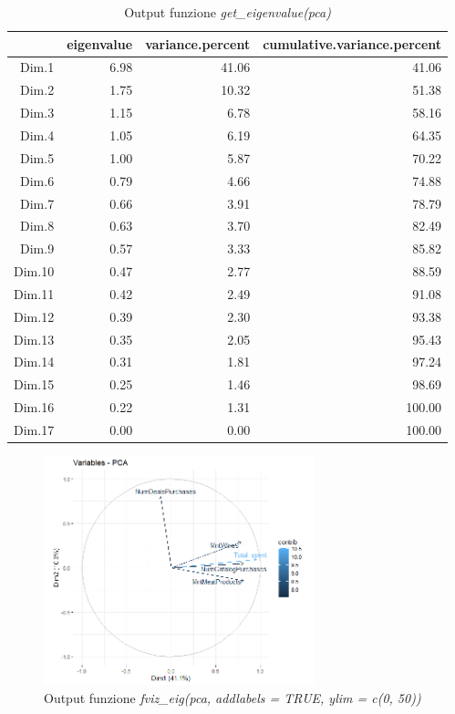 \documentclass[letterpaper,11pt]{article}
\begin{document}
\begin{table}[h!t]
\centering
\begin{tabular}{rrrr}
  \hline
 & eigenvalue & variance.percent & cumulative.variance.percent \\ 
  \hline
Dim.1 & 6.98 & 41.06 & 41.06 \\ 
  Dim.2 & 1.75 & 10.32 & 51.38 \\ 
  Dim.3 & 1.15 & 6.78 & 58.16 \\ 
  Dim.4 & 1.05 & 6.19 & 64.35 \\ 
  Dim.5 & 1.00 & 5.87 & 70.22 \\ 
  Dim.6 & 0.79 & 4.66 & 74.88 \\ 
  Dim.7 & 0.66 & 3.91 & 78.79 \\ 
  Dim.8 & 0.63 & 3.70 & 82.49 \\ 
  Dim.9 & 0.57 & 3.33 & 85.82 \\ 
  Dim.10 & 0.47 & 2.77 & 88.59 \\ 
  Dim.11 & 0.42 & 2.49 & 91.08 \\ 
  Dim.12 & 0.39 & 2.30 & 93.38 \\ 
  Dim.13 & 0.35 & 2.05 & 95.43 \\ 
  Dim.14 & 0.31 & 1.81 & 97.24 \\ 
  Dim.15 & 0.25 & 1.46 & 98.69 \\ 
  Dim.16 & 0.22 & 1.31 & 100.00 \\ 
  Dim.17 & 0.00 & 0.00 & 100.00 \\ 
   \hline
\end{tabular}
\caption{Output funzione \textit{get\_eigenvalue(pca)}}
\label{fig:get_eigenvalue(pca)}
\end{table}
\begin{figure}[h!]
    \centering
    \includegraphics[width=0.7\textwidth]{Img/PCA/Rplot04.png}
    \caption{Output funzione \textit{fviz\_eig(pca, addlabels = TRUE, ylim = c(0, 50))}}
    \label{fig:fviz_eig(pca, addlabels = TRUE, ylim = c(0, 50))}
\end{figure}
\end{document}
